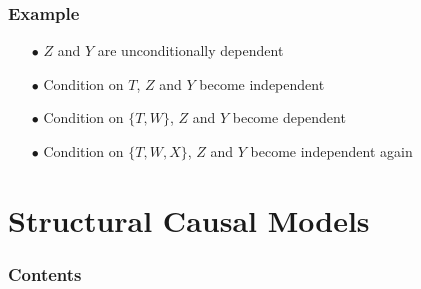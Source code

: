 \documentclass{beamer}
\begin{document}
\begin{frame}
    \frametitle{Example} 
    \begin{itemize}
        \item[$\bullet$] $Z$ and $Y$ are unconditionally dependent
        \item[$\bullet$] Condition on $T$, $Z$ and $Y$ become independent
        \item[$\bullet$] Condition on $\{T, W\}$, $Z$ and $Y$ become dependent
        \item[$\bullet$] Condition on $\{T, W, X\}$, $Z$ and $Y$ become independent again  
    \end{itemize}
\end{frame}


\section{Structural Causal Models}

\begin{frame}
    \frametitle{Contents}
    \tableofcontents[currentsection]
\end{frame}
\end{document}
